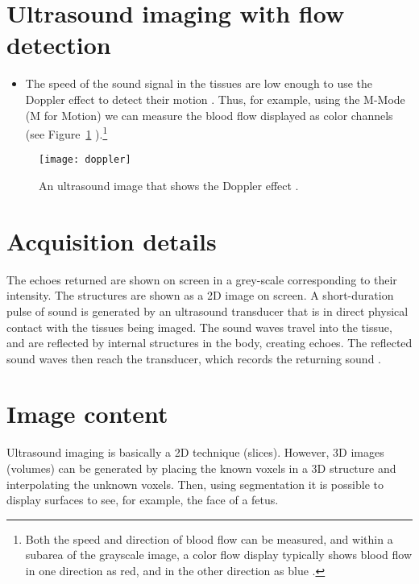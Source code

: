 \section{Ultrasound imaging with flow detection}

\begin{itemize}
\item The speed of the sound signal in the tissues are low enough to
  use the Doppler effect to detect their motion
  \cite{bushberg2011essential,abdulla2025ultrasound_machine}. Thus,
  for example, using the M-Mode (M for Motion) we can measure the
  blood flow displayed as color channels (see Figure~\ref{fig:doppler}
  ).\footnote{Both the speed and direction of blood flow can be
    measured, and within a subarea of the grayscale image, a color
    flow display typically shows blood flow in one direction as red,
    and in the other direction as blue \cite{bushberg2011essential}.}
\end{itemize}
\vspace{-3ex}
\begin{figure}[!h]
  \centering
  \texttt{[image: doppler]}
  \caption{An ultrasound image that shows the Doppler effect
    \cite{abdulla2025ultrasound_imaging_doppler}.\label{fig:doppler}}
\end{figure}

\section{Acquisition details}
The echoes returned are shown on screen in a grey-scale corresponding
to their intensity. The structures are shown as a 2D image on
screen. A short-duration pulse of sound is generated by an ultrasound
transducer that is in direct physical contact with the tissues being
imaged. The sound waves travel into the tissue, and are reflected by
internal structures in the body, creating echoes. The reflected sound
waves then reach the transducer, which records the returning sound
\cite{bushberg2011essential,abdulla2025ultrasound_machine}.



\section{Image content}
Ultrasound imaging is basically a 2D technique (slices). However, 3D
images (volumes) can be generated by placing the known voxels in a 3D
structure and interpolating the unknown voxels. Then, using
segmentation it is possible to display surfaces to see, for example,
the face of a fetus.

